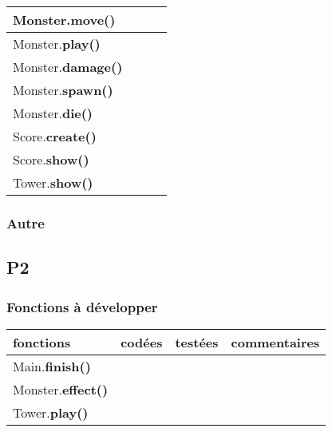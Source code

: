 \documentclass[a4paper]{article}
\begin{document}
\begin{tabular}{|l|c|c|c|}
                \hline
                Monster.\textbf{move()} & & & \\
                \hline
                Monster.\textbf{play()} & & & \\
                \hline
                Monster.\textbf{damage()} & & & \\
                \hline 
                Monster.\textbf{spawn()} & & & \\
                \hline
                Monster.\textbf{die()} & & & \\
                \hline
                \hline
                Score.\textbf{create()} & & & \\
                \hline
                Score.\textbf{show()} & & & \\
                \hline
                \hline
                Tower.\textbf{show()} & & & \\
                \hline
      
            \end{tabular}  
      
            \subsubsection{Autre}
        \subsection{P2}
            \subsubsection{Fonctions à développer}
            \begin{tabular}{|l|c|c|c|}
                \hline
                fonctions & codées & testées & commentaires \\
                \hline
                Main.\textbf{finish()} & & & \\
                \hline
                \hline
                Monster.\textbf{effect()} & & & \\
                \hline
                \hline
                Tower.\textbf{play()} & & & \\
                \hline 
            \end{tabular}
\end{document}
